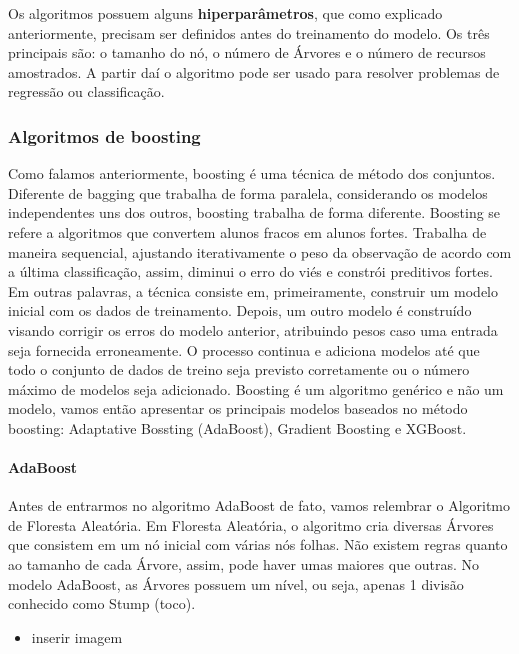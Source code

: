\documentclass[
  letterpaper,
  DIV=11,
  numbers=noendperiod]{scrreprt}
\let\oldparagraph\paragraph
\renewcommand{\paragraph}[1]{\oldparagraph{#1}\mbox{}}
\providecommand{\tightlist}{%
  \setlength{\itemsep}{0pt}\setlength{\parskip}{0pt}}\usepackage{longtable,booktabs,array}
\begin{document}
Os algoritmos possuem alguns \textbf{hiperparâmetros}, que como
explicado anteriormente, precisam ser definidos antes do treinamento do
modelo. Os três principais são: o tamanho do nó, o número de Árvores e o
número de recursos amostrados. A partir daí o algoritmo pode ser usado
para resolver problemas de regressão ou classificação.

\hypertarget{algoritmos-de-boosting}{%
\subsubsection{Algoritmos de boosting}\label{algoritmos-de-boosting}}

Como falamos anteriormente, boosting é uma técnica de método dos
conjuntos. Diferente de bagging que trabalha de forma paralela,
considerando os modelos independentes uns dos outros, boosting trabalha
de forma diferente. Boosting se refere a algoritmos que convertem alunos
fracos em alunos fortes. Trabalha de maneira sequencial, ajustando
iterativamente o peso da observação de acordo com a última
classificação, assim, diminui o erro do viés e constrói preditivos
fortes. Em outras palavras, a técnica consiste em, primeiramente,
construir um modelo inicial com os dados de treinamento. Depois, um
outro modelo é construído visando corrigir os erros do modelo anterior,
atribuindo pesos caso uma entrada seja fornecida erroneamente. O
processo continua e adiciona modelos até que todo o conjunto de dados de
treino seja previsto corretamente ou o número máximo de modelos seja
adicionado. Boosting é um algoritmo genérico e não um modelo, vamos
então apresentar os principais modelos baseados no método boosting:
Adaptative Bossting (AdaBoost), Gradient Boosting e XGBoost.

\hypertarget{adaboost}{%
\paragraph{AdaBoost}\label{adaboost}}

Antes de entrarmos no algoritmo AdaBoost de fato, vamos relembrar o
Algoritmo de Floresta Aleatória. Em Floresta Aleatória, o algoritmo cria
diversas Árvores que consistem em um nó inicial com várias nós folhas.
Não existem regras quanto ao tamanho de cada Árvore, assim, pode haver
umas maiores que outras. No modelo AdaBoost, as Árvores possuem um
nível, ou seja, apenas 1 divisão conhecido como Stump (toco).

\begin{itemize}
\tightlist
\item
  inserir imagem
\end{itemize}
\end{document}
